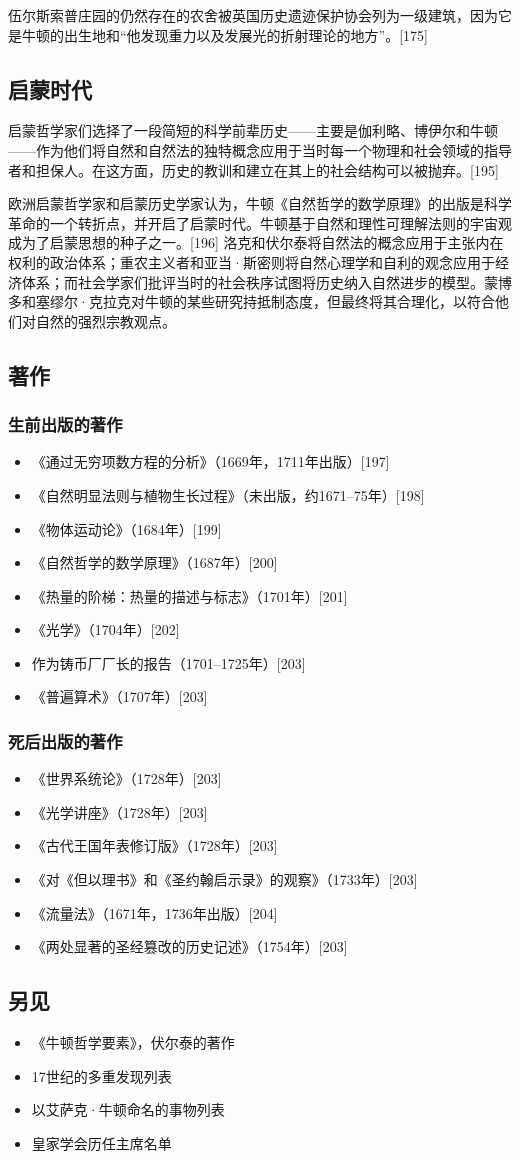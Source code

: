 伍尔斯索普庄园的仍然存在的农舍被英国历史遗迹保护协会列为一级建筑，因为它是牛顿的出生地和“他发现重力以及发展光的折射理论的地方”。[175]
\subsection{启蒙时代}  
启蒙哲学家们选择了一段简短的科学前辈历史——主要是伽利略、博伊尔和牛顿——作为他们将自然和自然法的独特概念应用于当时每一个物理和社会领域的指导者和担保人。在这方面，历史的教训和建立在其上的社会结构可以被抛弃。[195]

欧洲启蒙哲学家和启蒙历史学家认为，牛顿《自然哲学的数学原理》的出版是科学革命的一个转折点，并开启了启蒙时代。牛顿基于自然和理性可理解法则的宇宙观成为了启蒙思想的种子之一。[196] 洛克和伏尔泰将自然法的概念应用于主张内在权利的政治体系；重农主义者和亚当·斯密则将自然心理学和自利的观念应用于经济体系；而社会学家们批评当时的社会秩序试图将历史纳入自然进步的模型。蒙博多和塞缪尔·克拉克对牛顿的某些研究持抵制态度，但最终将其合理化，以符合他们对自然的强烈宗教观点。
\subsection{著作}  
\subsubsection{生前出版的著作}  
\begin{itemize}
\item 《通过无穷项数方程的分析》（1669年，1711年出版）[197]  
\item 《自然明显法则与植物生长过程》（未出版，约1671–75年）[198]  
\item 《物体运动论》（1684年）[199]  
\item 《自然哲学的数学原理》（1687年）[200]  
\item 《热量的阶梯：热量的描述与标志》（1701年）[201]  
\item 《光学》（1704年）[202]  
\item 作为铸币厂厂长的报告（1701–1725年）[203]  
\item 《普遍算术》（1707年）[203]
\end{itemize}
\subsubsection{死后出版的著作}  
\begin{itemize}
\item 《世界系统论》（1728年）[203]  
\item 《光学讲座》（1728年）[203]  
\item 《古代王国年表修订版》（1728年）[203]  
\item 《对《但以理书》和《圣约翰启示录》的观察》（1733年）[203]  
\item 《流量法》（1671年，1736年出版）[204]  
\item 《两处显著的圣经篡改的历史记述》（1754年）[203]
\end{itemize}
\subsection{另见}
\begin{itemize}
\item 《牛顿哲学要素》，伏尔泰的著作  
\item 17世纪的多重发现列表  
\item 以艾萨克·牛顿命名的事物列表  
\item 皇家学会历任主席名单
\end{itemize}